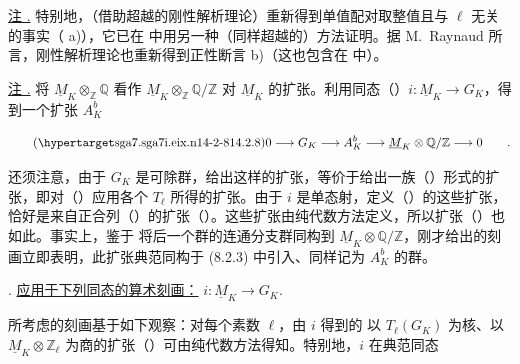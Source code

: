 \medskip
\noindent
\underline{注 .} 特别地，（借助超越的刚性解析理论）重新得到单值配对取整值且与 $\ell$ 无关的事实（ a)），它已在  中用另一种（同样超越的）方法证明。据 M.~Raynaud 所言，刚性解析理论也重新得到正性断言  b)（这也包含在  中）。

\medskip
\noindent
\underline{注 .} 将 $\underline M_K\otimes_{\mathbb Z}\mathbb Q$ 看作 $\underline M_K\otimes_{\mathbb Z}\mathbb Q/\mathbb Z$ 对 $\underline M_K$ 的扩张。利用同态（）$i:\underline M_K\longrightarrow G_K$，得到一个扩张 $A_K^b$

\begin{equation}\tag{\SGARefTarget{sga7.sga7i.eix.n14-2-8}{14.2.8}}
 0\longrightarrow G_K\longrightarrow A_K^b
 \longrightarrow\underline M_K\otimes\mathbb Q/\mathbb Z
 \longrightarrow0\qquad .
\end{equation}

\noindent
还须注意，由于 $G_K$ 是可除群，给出这样的扩张，等价于给出一族（）形式的扩张，即对（）应用各个 $T_\ell$ 所得的扩张。由于 $i$ 是单态射，定义（）的这些扩张，恰好是来自正合列（）的扩张（）。这些扩张由纯代数方法定义，所以扩张（）也如此。事实上，鉴于  将后一个群的连通分支群同构到 $\underline M_K\otimes\mathbb Q/\mathbb Z$，刚才给出的刻画立即表明，此扩张典范同构于 (8.2.3) 中引入、同样记为 $A_K^b$ 的群。


\par\medskip
\noindent
{}. \underline{应用于下列同态的算术刻画：}
$i:\underline M_K\longrightarrow G_K$.

所考虑的刻画基于如下观察：对每个素数 $\ell$，由 $i$ 得到的 以 $T_\ell(G_K)$ 为核、以 $\underline M_K\otimes\mathbb Z_\ell$ 为商的扩张（）可由纯代数方法得知。特别地，$i$ 在典范同态

